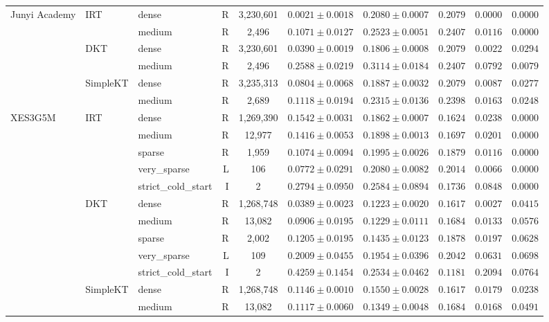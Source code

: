 \begin{table}[htbp]
{\begin{tabular}{lllrcccccc}
\midrule
Junyi Academy & IRT & dense & R & 3,230,601 & $0.0021 \pm 0.0018$ & $0.2080 \pm 0.0007$ & $0.2079$ & $0.0000$ & $0.0000$ \\
 &  & medium & R & 2,496 & $0.1071 \pm 0.0127$ & $0.2523 \pm 0.0051$ & $0.2407$ & $0.0116$ & $0.0000$ \\
 & DKT & dense & R & 3,230,601 & $0.0390 \pm 0.0019$ & $0.1806 \pm 0.0008$ & $0.2079$ & $0.0022$ & $0.0294$ \\
 &  & medium & R & 2,496 & $0.2588 \pm 0.0219$ & $0.3114 \pm 0.0184$ & $0.2407$ & $0.0792$ & $0.0079$ \\
 & SimpleKT & dense & R & 3,235,313 & $0.0804 \pm 0.0068$ & $0.1887 \pm 0.0032$ & $0.2079$ & $0.0087$ & $0.0277$ \\
 &  & medium & R & 2,689 & $0.1118 \pm 0.0194$ & $0.2315 \pm 0.0136$ & $0.2398$ & $0.0163$ & $0.0248$ \\
\midrule
XES3G5M & IRT & dense & R & 1,269,390 & $0.1542 \pm 0.0031$ & $0.1862 \pm 0.0007$ & $0.1624$ & $0.0238$ & $0.0000$ \\
 &  & medium & R & 12,977 & $0.1416 \pm 0.0053$ & $0.1898 \pm 0.0013$ & $0.1697$ & $0.0201$ & $0.0000$ \\
 &  & sparse & R & 1,959 & $0.1074 \pm 0.0094$ & $0.1995 \pm 0.0026$ & $0.1879$ & $0.0116$ & $0.0000$ \\
 &  & very\_sparse & L & 106 & $0.0772 \pm 0.0291$ & $0.2080 \pm 0.0082$ & $0.2014$ & $0.0066$ & $0.0000$ \\
 &  & strict\_cold\_start & I & 2 & $0.2794 \pm 0.0950$ & $0.2584 \pm 0.0894$ & $0.1736$ & $0.0848$ & $0.0000$ \\
 & DKT & dense & R & 1,268,748 & $0.0389 \pm 0.0023$ & $0.1223 \pm 0.0020$ & $0.1617$ & $0.0027$ & $0.0415$ \\
 &  & medium & R & 13,082 & $0.0906 \pm 0.0195$ & $0.1229 \pm 0.0111$ & $0.1684$ & $0.0133$ & $0.0576$ \\
 &  & sparse & R & 2,002 & $0.1205 \pm 0.0195$ & $0.1435 \pm 0.0123$ & $0.1878$ & $0.0197$ & $0.0628$ \\
 &  & very\_sparse & L & 109 & $0.2009 \pm 0.0455$ & $0.1954 \pm 0.0396$ & $0.2042$ & $0.0631$ & $0.0698$ \\
 &  & strict\_cold\_start & I & 2 & $0.4259 \pm 0.1454$ & $0.2534 \pm 0.0462$ & $0.1181$ & $0.2094$ & $0.0764$ \\
 & SimpleKT & dense & R & 1,268,748 & $0.1146 \pm 0.0010$ & $0.1550 \pm 0.0028$ & $0.1617$ & $0.0179$ & $0.0238$ \\
 &  & medium & R & 13,082 & $0.1117 \pm 0.0060$ & $0.1349 \pm 0.0048$ & $0.1684$ & $0.0168$ & $0.0491$ \\

\end{tabular}}
\end{table}
